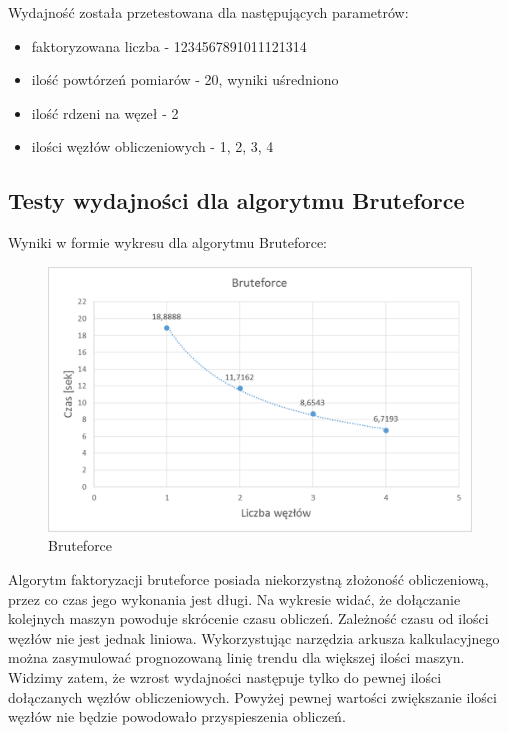 \documentclass{article}
\begin{document}
Wydajność została przetestowana dla następujących parametrów:
\begin{itemize}
\item faktoryzowana liczba - 1234567891011121314
\item ilość powtórzeń pomiarów - 20, wyniki uśredniono
\item ilość rdzeni na węzeł - 2
\item ilości węzłów obliczeniowych - 1, 2, 3, 4
\end{itemize}
\subsection{Testy wydajności dla algorytmu Bruteforce}
Wyniki w formie wykresu dla algorytmu Bruteforce:
\begin{figure}[h!]
    \includegraphics[width=\linewidth]{Bruteforce.png}
    \caption{Bruteforce}
    \label{fig:userpagescr}
\end{figure}
\newpage
Algorytm faktoryzacji bruteforce posiada niekorzystną złożoność obliczeniową, przez co czas jego wykonania jest długi. Na wykresie widać, że dołączanie kolejnych maszyn powoduje skrócenie czasu obliczeń. Zależność czasu od ilości węzłów nie jest jednak liniowa. Wykorzystując narzędzia arkusza kalkulacyjnego można zasymulować prognozowaną linię trendu dla większej ilości maszyn. Widzimy zatem, że wzrost wydajności następuje tylko do pewnej ilości dołączanych węzłów obliczeniowych. Powyżej pewnej wartości zwiększanie ilości węzłów nie będzie powodowało przyspieszenia obliczeń.
\end{document}

